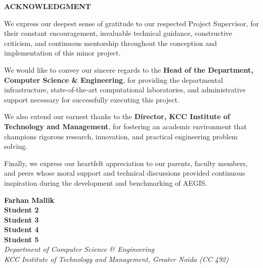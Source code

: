 \newpage
\thispagestyle{plain}
\begin{center}
{\Large \textbf{ACKNOWLEDGMENT}}\\[1.0cm]
\end{center}

\noindent We express our deepest sense of gratitude to our respected Project Supervisor, for their constant encouragement, invaluable technical guidance, constructive criticism, and continuous mentorship throughout the conception and implementation of this minor project.

\vspace{0.4cm}
\noindent We would like to convey our sincere regards to the \textbf{Head of the Department, Computer Science \& Engineering}, for providing the departmental infrastructure, state-of-the-art computational laboratories, and administrative support necessary for successfully executing this project.

\vspace{0.4cm}
\noindent We also extend our earnest thanks to the \textbf{Director, KCC Institute of Technology and Management}, for fostering an academic environment that champions rigorous research, innovation, and practical engineering problem solving.

\vspace{0.4cm}
\noindent Finally, we express our heartfelt appreciation to our parents, faculty members, and peers whose moral support and technical discussions provided continuous inspiration during the development and benchmarking of AEGIS.

\vspace{1.5cm}
\begin{flushright}
\textbf{Farhan Mallik}\\
\textbf{Student 2}\\
\textbf{Student 3}\\
\textbf{Student 4}\\
\textbf{Student 5}\\[0.4cm]
\textit{Department of Computer Science \& Engineering}\\
\textit{KCC Institute of Technology and Management, Greater Noida (CC 492)}
\end{flushright}
